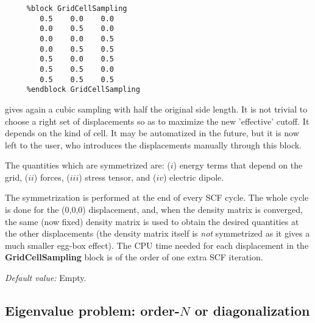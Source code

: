 \begin{description}
\begin{verbatim}
     %block GridCellSampling
        0.5    0.0    0.0
        0.0    0.5    0.0
        0.0    0.0    0.5
        0.0    0.5    0.5
        0.5    0.0    0.5
        0.5    0.5    0.0
        0.5    0.5    0.5
     %endblock GridCellSampling
\end{verbatim}

gives again a cubic sampling with half the original side length.
It is not trivial to choose a right set of displacements so as
to maximize the new 'effective' cutoff. It depends on the 
kind of cell. It may be automatized in the future, but it 
is now left to the user, who introduces the displacements
manually through this block.

The quantities which are symmetrized are: ($i$) energy terms
that depend on the grid, ($ii$) forces, ($iii$) stress
tensor, and ($iv$) electric dipole.

The symmetrization is performed at the end of every SCF cycle. The 
whole cycle is done for the (0,0,0) displacement, and, when the
density matrix is converged, the same (now fixed)
density matrix is used to obtain the desired quantities at the 
other displacements (the density matrix itself is {\it not}
symmetrized as it gives a much smaller egg-box effect).
The CPU time needed for each displacement
in the {\bf GridCellSampling} block
is of the order of one extra SCF iteration.

{\it Default value:} Empty.

\end{description}



\vspace{5pt}
\subsection{Eigenvalue problem: order-$N$ or diagonalization}


